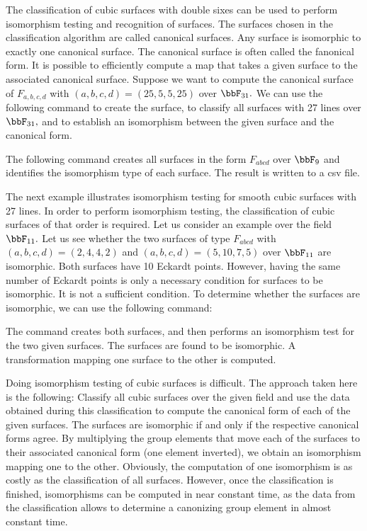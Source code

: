 The classification of cubic surfaces with double sixes 
can be used to perform isomorphism testing and recognition of surfaces. 
The surfaces chosen in the classification algorithm are called canonical surfaces. 
Any surface is isomorphic to exactly one canonical surface.
The canonical surface is often called the fanonical form.
It is possible to efficiently compute a map that takes a given surface to the associated canonical surface.  
Suppose we want to compute the canonical surface of $F_{a,b,c,d}$ with $(a,b,c,d) = (25,5,5,25)$ over $\bbF_{31}.$ 
We can use the following command to create the surface, 
to classify all surfaces with 27 lines over $\bbF_{31},$ and to establish  
an isomorphism between the given surface and the canonical form.




\bigskip

The following command creates all surfaces in the form 
$F_{abcd}$ over $\bbF_{9}$ and identifies the isomorphism type of each surface.
The result is written to a csv file.



\bigskip


The next example illustrates isomorphism testing for smooth cubic surfaces with 27 lines. 
In order to perform isomorphism testing, the classification of cubic surfaces of that order is required.
Let us consider an example over the field $\bbF_{11}.$
Let us see whether the two surfaces of type $F_{abcd}$ 
with $(a,b,c,d) = (2,4,4,2)$ and $(a,b,c,d) = (5,10,7,5)$ over $\bbF_{11}$ are isomorphic.
Both surfaces have 10 Eckardt points. 
However, having the same number of Eckardt points is only a necessary condition for surfaces to be isomorphic. 
It is not a sufficient condition.
To determine whether the surfaces are isomorphic, 
we can use the following command:


The command creates both surfaces, 
and then performs an isomorphism 
test for the two given surfaces. The surfaces are found to be isomorphic. 
A transformation mapping one surface to the other is computed.

\bigskip

Doing isomorphism testing of cubic surfaces is difficult. 
The approach taken here is the following:
Classify all cubic surfaces over the given field and use the data 
obtained during this classification to compute 
the canonical form of each of the given surfaces. 
The surfaces are isomorphic if and only if the respective canonical forms agree. 
By multiplying the group elements that move each of the surfaces 
to their associated canonical form (one element inverted), 
we obtain an isomorphism mapping one to the other. 
Obviously, the computation of one isomorphism is as costly as the classification of all surfaces.
However, once the classification is finished, isomorphisms can be computed in near constant time, 
as the data from the classification allows to determine 
a canonizing group element in almost constant time. 


